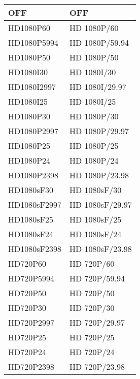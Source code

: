 \begin{tabular}{|l|l|}
\hline
		OFF         &   OFF            \\ \hline
		HD1080P60   &   HD 1080P/60    \\ \hline
		HD1080P5994 &   HD 1080P/59.94 \\ \hline
    HD1080P50   &   HD 1080P/50    \\ \hline
    HD1080I30   &   HD 1080I/30    \\ \hline                   
    HD1080I2997 &   HD 1080I/29.97 \\ \hline                  
    HD1080I25   &   HD 1080I/25    \\ \hline                   
    HD1080P30   &   HD 1080P/30    \\ \hline                   
    HD1080P2997 &   HD 1080P/29.97 \\ \hline                  
    HD1080P25   &   HD 1080P/25    \\ \hline                   
    HD1080P24   &   HD 1080P/24    \\ \hline                   
    HD1080P2398 &   HD 1080P/23.98 \\ \hline                  
    HD1080sF30  &   HD 1080sF/30   \\ \hline                       
    HD1080sF2997&   HD 1080sF/29.97\\ \hline                      
    HD1080sF25  &   HD 1080sF/25   \\ \hline                       
    HD1080sF24  &   HD 1080sF/24   \\ \hline                       
    HD1080sF2398&   HD 1080sF/23.98\\ \hline                      
    HD720P60    &   HD 720P/60     \\ \hline                   
    HD720P5994  &   HD 720P/59.94  \\ \hline                  
    HD720P50    &   HD 720P/50     \\ \hline               
    HD720P30    &   HD 720P/30     \\ \hline               
    HD720P2997  &   HD 720P/29.97  \\ \hline              
    HD720P25    &   HD 720P/25     \\ \hline               
    HD720P24    &   HD 720P/24     \\ \hline               
    HD720P2398  &   HD 720P/23.98  \\ \hline
\end{tabular}

